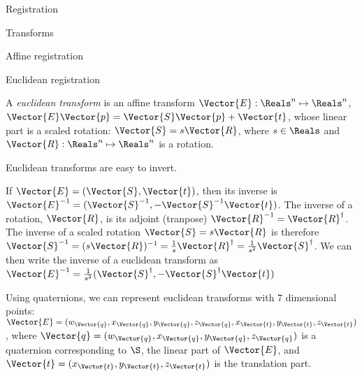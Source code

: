\begin{plSection}{Registration}
\begin{plSection}{Transforms}
\begin{plSection}{Affine registration}
\end{plSection}%
\begin{plSection}{Euclidean registration}
\label{sec:euclidean-registration}

A {\it euclidean transform} is an affine transform
$\Vector{E} : \Reals^n \mapsto \Reals^n$,
$\Vector{E} \Vector{p} = \Vector{S} \Vector{p} + \Vector{t} $,
whose linear part is a scaled rotation:
$\Vector{S} = s \Vector{R}$,
where $s \in \Reals$ and $\Vector{R} : \Reals^n \mapsto \Reals^n$
is a rotation.

Euclidean transforms are easy to invert.

If $\Vector{E} = (\Vector{S},\Vector{t})$, then its inverse is
$\Vector{E}^{-1} = (\Vector{S}^{-1}, - \Vector{S}^{-1}\Vector{t})$.
The inverse of a rotation, $\Vector{R}$, is its adjoint
(tranpose) $\Vector{R}^{-1} = \Vector{R}^{\dagger}$.
The inverse of a scaled rotation $\Vector{S} = s \Vector{R}$
is therefore
$\Vector{S}^{-1} = (s \Vector{R})^{-1}
         = \frac{1}{s} \Vector{R}^{\dagger}
         = \frac{1}{s^2} \Vector{S}^{\dagger}$.
We can then write the inverse of a euclidean transform as
$\Vector{E}^{-1} = 
\frac{1}{s^2}(\Vector{S}^{\dagger}, 
- \Vector{S}^{\dagger}\Vector{t})$

Using quaternions, we can represent euclidean transforms with
7 dimensional points:
$\Vector{E} = (w_{\Vector{q}}, x_{\Vector{q}}, y_{\Vector{q}}, z_{\Vector{q}}, x_{\Vector{t}}, y_{\Vector{t}}, z_{\Vector{t}})$,
where $\Vector{q} = (w_{\Vector{q}}, x_{\Vector{q}}, y_{\Vector{q}}, z_{\Vector{q}})$ 
is a quaternion corresponding
to $\S$, the linear part of $\Vector{E}$,
and $\Vector{t} = (x_{\Vector{t}}, y_{\Vector{t}}, z_{\Vector{t}})$ is the translation part.


\end{plSection}
\end{plSection}
\end{plSection}
